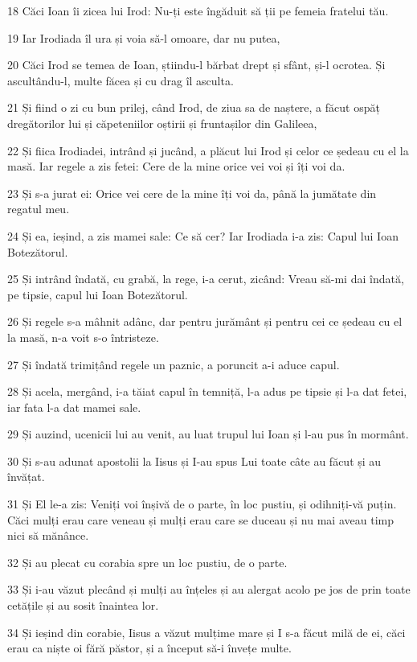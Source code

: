 \par 18 Căci Ioan îi zicea lui Irod: Nu-ți este îngăduit să ții pe femeia fratelui tău.
\par 19 Iar Irodiada îl ura și voia să-l omoare, dar nu putea,
\par 20 Căci Irod se temea de Ioan, știindu-l bărbat drept și sfânt, și-l ocrotea. Și ascultându-l, multe făcea și cu drag îl asculta.
\par 21 Și fiind o zi cu bun prilej, când Irod, de ziua sa de naștere, a făcut ospăț dregătorilor lui și căpeteniilor oștirii și fruntașilor din Galileea,
\par 22 Și fiica Irodiadei, intrând și jucând, a plăcut lui Irod și celor ce ședeau cu el la masă. Iar regele a zis fetei: Cere de la mine orice vei voi și îți voi da.
\par 23 Și s-a jurat ei: Orice vei cere de la mine îți voi da, până la jumătate din regatul meu.
\par 24 Și ea, ieșind, a zis mamei sale: Ce să cer? Iar Irodiada i-a zis: Capul lui Ioan Botezătorul.
\par 25 Și intrând îndată, cu grabă, la rege, i-a cerut, zicând: Vreau să-mi dai îndată, pe tipsie, capul lui Ioan Botezătorul.
\par 26 Și regele s-a mâhnit adânc, dar pentru jurământ și pentru cei ce ședeau cu el la masă, n-a voit s-o întristeze.
\par 27 Și îndată trimițând regele un paznic, a poruncit a-i aduce capul.
\par 28 Și acela, mergând, i-a tăiat capul în temniță, l-a adus pe tipsie și l-a dat fetei, iar fata l-a dat mamei sale.
\par 29 Și auzind, ucenicii lui au venit, au luat trupul lui Ioan și l-au pus în mormânt.
\par 30 Și s-au adunat apostolii la Iisus și I-au spus Lui toate câte au făcut și au învățat.
\par 31 Și El le-a zis: Veniți voi înșivă de o parte, în loc pustiu, și odihniți-vă puțin. Căci mulți erau care veneau și mulți erau care se duceau și nu mai aveau timp nici să mănânce.
\par 32 Și au plecat cu corabia spre un loc pustiu, de o parte.
\par 33 Și i-au văzut plecând și mulți au înțeles și au alergat acolo pe jos de prin toate cetățile și au sosit înaintea lor.
\par 34 Și ieșind din corabie, Iisus a văzut mulțime mare și I s-a făcut milă de ei, căci erau ca niște oi fără păstor, și a început să-i învețe multe.
